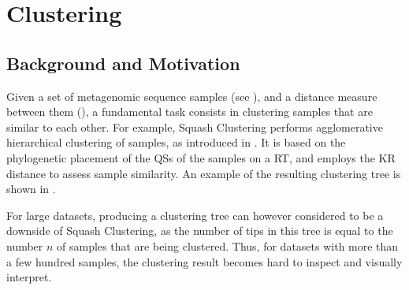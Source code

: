 
\chapter{Clustering}
\label{ch:Clustering}




\section{Background and Motivation}
\label{ch:Clustering:sec:Motivation}

Given a set of metagenomic sequence samples (see ),
and a distance measure between them (),
a fundamental task consists in clustering samples that are similar to each other.
For example, Squash Clustering performs agglomerative hierarchical clustering of samples,
as introduced in .
It is based on the phylogenetic placement of the \acfp{QS} of the samples on a \acf{RT},
and employs the KR distance to assess sample similarity.
An example of the resulting clustering tree is shown in .

For large datasets, producing a clustering tree can however considered to be a downside of Squash Clustering,
as the number of tips in this tree is equal to the number $n$ of samples that are being clustered.
Thus, for datasets with more than a few hundred samples,
the clustering result becomes hard to inspect and visually interpret.

